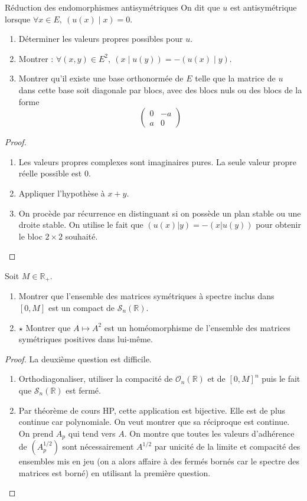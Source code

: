 \documentclass[french,a4paper]{article}
\newcommand{\R}{\mathbb{R}}
\theoremstyle{plain}
\theoremstyle{definition}
\theoremstyle{remark}
\begin{document}
\begin{ex}{Réduction des endomorphismes antisymétriques}
	On dit que $u$ est antisymétrique lorsque $\forall x\in E,\ (u(x)\mid x)=0$.
	\begin{enumerate}
		\item Déterminer les valeurs propres possibles pour $u$.
		\item Montrer : $\forall (x,y)\in E^2,\ (x\mid u(y))=-(u(x)\mid y)$.
		\item Montrer qu'il existe une base orthonormée de $E$ telle que la matrice de $u$ dans cette base soit diagonale par blocs, avec des blocs nuls ou des blocs de la forme $$\begin{pmatrix}
			0&-a\\
			a&0
		\end{pmatrix}$$
	\end{enumerate}
\end{ex}
\begin{proof}
	\begin{enumerate}
		\item Les valeurs propres complexes sont imaginaires pures. La seule valeur propre réelle possible est $0$.
		\item Appliquer l'hypothèse à $x+y$.
		\item On procède par récurrence en distinguant si on possède un plan stable ou une droite stable. On utilise le fait que $(u(x)|y)=-(x|u(y))$ pour obtenir le bloc $2\times 2$ souhaité.
	\end{enumerate}
\end{proof}

\begin{ex}{}
	Soit $M\in\R_+$.
	\begin{enumerate}
		\item Montrer que l'ensemble des matrices symétriques à spectre inclus dans $[0,M]$ est un compact de $\mathcal{S}_n(\R)$.
		\item $\star$ Montrer que $A\mapsto A^2$ est un homéomorphisme de l'ensemble des matrices symétriques positives dans lui-même.
	\end{enumerate}
\end{ex}
\begin{proof}
	La deuxième question est difficile.
	\begin{enumerate}
		\item Orthodiagonaliser, utiliser la compacité de $\mathcal{O}_n(\R)$ et de $[0,M]^n$ puis le fait que $\mathcal{S}_n(\R)$ est fermé.
		\item Par théorème de cours HP, cette application est bijective. Elle est de plus continue car polynomiale. On veut montrer que sa réciproque est continue. On prend $A_p$ qui tend vers $A$. On montre que toutes les valeurs d'adhérence de $(A_p^{1/2})$ sont nécessairement $A^{1/2}$ par unicité de la limite et compacité des ensembles mis en jeu (on a alors affaire à des fermés bornés car le spectre des matrices est borné) en utilisant la première question.
	\end{enumerate}
\end{proof}
\end{document}
